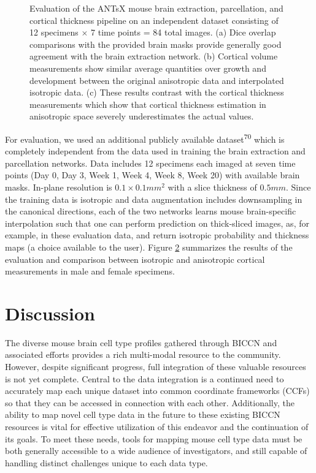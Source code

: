 \documentclass[
  12pt,
]{article}
\begin{document}
\begin{figure}
\begin{subfigure}{.5\textwidth}
  \caption{}
  \label{fig:subc}
\end{subfigure}
\caption{Evaluation of the ANTsX mouse brain extraction, parcellation, and
cortical thickness pipeline on an independent dataset 
consisting of 12 specimens $\times$ 7 time points = 
84 total images.  (a) Dice overlap comparisons with the provided brain
masks provide generally good agreement with the brain extraction network.
(b) Cortical volume measurements show similar average quantities over
growth and development between the original anisotropic data and 
interpolated isotropic data.  (c) These results contrast with the cortical
thickness measurements which show that cortical thickness estimation 
in anisotropic space severely underestimates the actual values.}
\label{fig:evaluation}
\end{figure}

For evaluation, we used an additional publicly available
dataset\textsuperscript{70} which is completely independent from the
data used in training the brain extraction and parcellation networks.
Data includes 12 specimens each imaged at seven time points (Day 0, Day
3, Week 1, Week 4, Week 8, Week 20) with available brain masks. In-plane
resolution is \(0.1 \times 0.1 mm^2\) with a slice thickness of
\(0.5 mm\). Since the training data is isotropic and data augmentation
includes downsampling in the canonical directions, each of the two
networks learns mouse brain-specific interpolation such that one can
perform prediction on thick-sliced images, as, for example, in these
evaluation data, and return isotropic probability and thickness maps (a
choice available to the user). Figure \ref{fig:evaluation} summarizes
the results of the evaluation and comparison between isotropic and
anisotropic cortical measurements in male and female specimens.

\clearpage
\newpage

\section{Discussion}\label{discussion}

The diverse mouse brain cell type profiles gathered through BICCN and
associated efforts provides a rich multi-modal resource to the
community. However, despite significant progress, full integration of
these valuable resources is not yet complete. Central to the data
integration is a continued need to accurately map each unique dataset
into common coordinate frameworks (CCFs) so that they can be accessed in
connection with each other. Additionally, the ability to map novel cell
type data in the future to these existing BICCN resources is vital for
effective utilization of this endeavor and the continuation of its
goals. To meet these needs, tools for mapping mouse cell type data must
be both generally accessible to a wide audience of investigators, and
still capable of handling distinct challenges unique to each data type.
\end{document}
